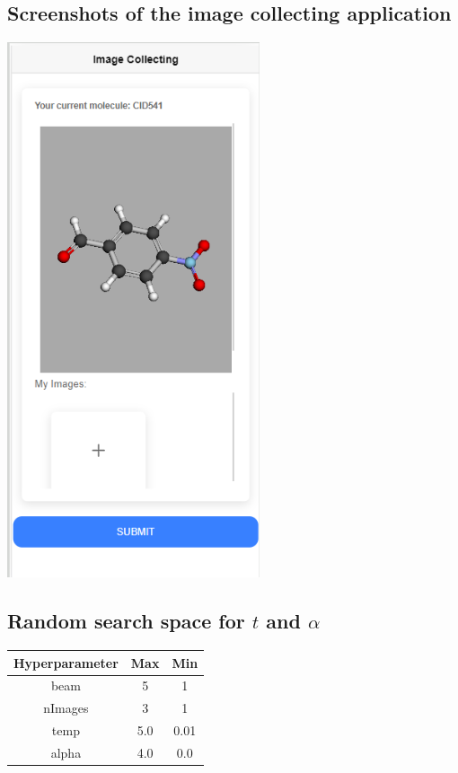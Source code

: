 \documentclass[12pt]{article}
\begin{document}
\subsection*{Screenshots of the image collecting application}

\begin{center}
    \includegraphics[width=0.3\linewidth]{ss2.png}
\end{center}
\subsection*{Random search space for $t$ and $\alpha$}
\begin{tabular}{c|c|c}
Hyperparameter & Max & Min \\ \hline
beam & 5  & 1 \\ 
nImages & 3  & 1 \\
temp & 5.0  & 0.01 \\
alpha & 4.0  & 0.0 \\
\end{tabular}
\end{document}
